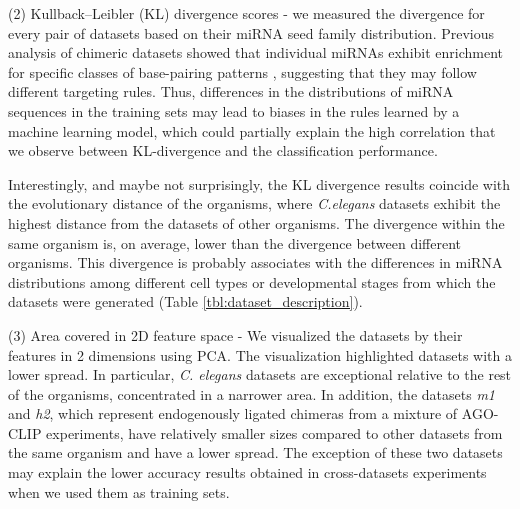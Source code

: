 \documentclass{bmcart}
\begin{document}
(2) Kullback–Leibler (KL) divergence scores -  we measured the divergence for every pair of datasets based on their miRNA seed family distribution. Previous analysis of chimeric datasets showed that individual miRNAs exhibit enrichment for specific classes of base-pairing patterns \cite{helwak2013mapping, broughton2016pairing}, suggesting that they may follow different targeting rules.
Thus, differences in the distributions of miRNA sequences in the training sets may lead to biases in the rules learned by a machine learning model, which could partially explain the high correlation that we observe between KL-divergence and the classification performance.  

Interestingly, and maybe not surprisingly, the KL divergence results coincide with the evolutionary distance of the organisms, where \textit{C.elegans} datasets exhibit the highest distance from the datasets of other organisms. The divergence within the same organism is, on average, lower than the divergence between different organisms. This divergence is probably associates with the differences in miRNA distributions among different cell types or developmental stages from which the datasets were generated (Table \ref{tbl:dataset_description}). 

(3) Area covered in 2D feature space - We visualized the datasets by their features in 2 dimensions using PCA. The visualization highlighted datasets with a lower spread. In particular, \textit{C. elegans} datasets are exceptional relative to the rest of the organisms, concentrated in a narrower area. In addition, the datasets \textit{m1} and \textit{h2}, which represent endogenously ligated chimeras from a mixture of AGO-CLIP experiments, have relatively smaller sizes compared to other datasets from the same organism and have a lower spread. The exception of these two datasets may explain the lower accuracy results obtained in cross-datasets experiments when we used them as training sets.
\end{document}

